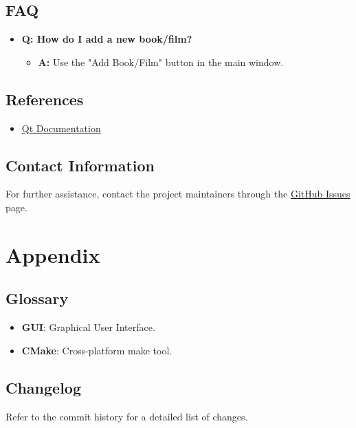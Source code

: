 \documentclass{article}
\begin{document}
\subsection{FAQ}

\begin{itemize}
    \item \textbf{Q: How do I add a new book/film?}
    \begin{itemize}
        \item \textbf{A:} Use the "Add Book/Film" button in the main window.
    \end{itemize}
\end{itemize}


\subsection{References}

\begin{itemize}
    \item \href{https://doc.qt.io/}{Qt Documentation}
\end{itemize}


\subsection{Contact Information}

For further assistance, contact the project maintainers through the \href{https://github.com/Libra232/BlindChoice/issues}{GitHub Issues} page.



\section{Appendix}


\subsection{Glossary}

\begin{itemize}
    \item \textbf{GUI}: Graphical User Interface.
    \item \textbf{CMake}: Cross-platform make tool.
\end{itemize}


\subsection{Changelog}

Refer to the commit history for a detailed list of changes.
\end{document}
